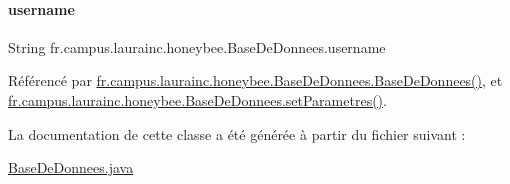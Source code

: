 \mbox{\label{classfr_1_1campus_1_1laurainc_1_1honeybee_1_1_base_de_donnees_a7d1662e10f11f740155774b625ed1a87}} 
\paragraph{\texorpdfstring{username}{username}}
{\footnotesize\ttfamily String fr.\+campus.\+laurainc.\+honeybee.\+Base\+De\+Donnees.\+username\hspace{0.3cm}{\ttfamily [private]}}



Référencé par \hyperlink{classfr_1_1campus_1_1laurainc_1_1honeybee_1_1_base_de_donnees_a2f6274017a47cc8f331c582f9a7ad6d1}{fr.\+campus.\+laurainc.\+honeybee.\+Base\+De\+Donnees.\+Base\+De\+Donnees()}, et \hyperlink{classfr_1_1campus_1_1laurainc_1_1honeybee_1_1_base_de_donnees_a0960cb9d71647e80e195a580f90cd0d6}{fr.\+campus.\+laurainc.\+honeybee.\+Base\+De\+Donnees.\+set\+Parametres()}.



La documentation de cette classe a été générée à partir du fichier suivant \+:\begin{DoxyCompactItemize}
\item 
\hyperlink{_base_de_donnees_8java}{Base\+De\+Donnees.\+java}\end{DoxyCompactItemize}
